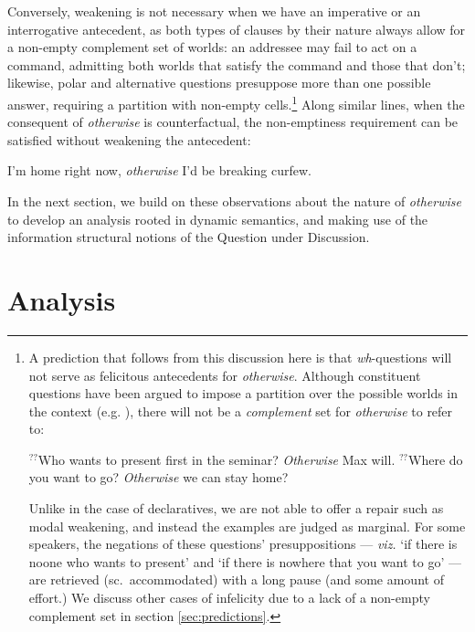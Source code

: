 Conversely, weakening is not necessary when we have an imperative or an interrogative antecedent, as both types of clauses by their nature always allow for a non-empty complement set of worlds: an addressee may fail to act on a command, admitting both worlds that satisfy the command and those that don't; likewise, polar and alternative questions presuppose more than one possible answer, requiring a partition with non-empty cells.\footnote{\label{whQ}A prediction that follows from this discussion here is that \textit{wh}-questions will not serve as felicitous antecedents for \textit{otherwise}. Although constituent questions have been argued to impose a partition over the possible worlds in the context (e.g. \citealt{groenendijk1984}), there will not be a \textit{complement} set for \textit{otherwise} to refer to:
	
	\pex  
	\a $ ^{??} $Who wants to present first in the seminar? \textit{Otherwise} Max will.   
	\a $ ^{??} $Where do you want to go? \textit{Otherwise} we can stay home?\xe
	
	Unlike in the case of declaratives, we are not able to offer a repair such as modal weakening, and instead the examples are judged as marginal. For some speakers, the negations of these questions' presuppositions --- \textit{viz.} `if there is noone who wants to present' and `if there is nowhere that you want to go' --- are retrieved (sc.\ accommodated) with a long pause (and some amount of effort.) We discuss other cases of infelicity due to a lack of a non-empty complement set in section \ref{sec:predictions}. 
}%
Along similar lines, when the consequent of \textit{otherwise} is counterfactual, the non-emptiness requirement can be satisfied without weakening the antecedent:

\pex  I'm home right now, \textit{otherwise} I'd be breaking curfew. \xe


In the next section, we build on these observations about the nature of \textit{otherwise} to develop an analysis rooted in dynamic semantics, and making use of the information structural notions of the Question under Discussion. 


\section{Analysis} \label{sec:analysis}


